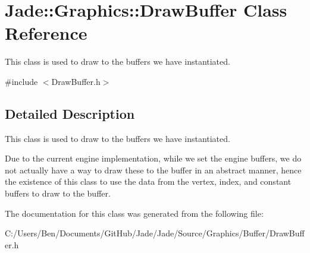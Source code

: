 \hypertarget{class_jade_1_1_graphics_1_1_draw_buffer}{}\section{Jade\+:\+:Graphics\+:\+:Draw\+Buffer Class Reference}
\label{class_jade_1_1_graphics_1_1_draw_buffer}


This class is used to draw to the buffers we have instantiated.  




{\ttfamily \#include $<$Draw\+Buffer.\+h$>$}



\subsection{Detailed Description}
This class is used to draw to the buffers we have instantiated. 

Due to the current engine implementation, while we set the engine buffers, we do not actually have a way to draw these to the buffer in an abstract manner, hence the existence of this class to use the data from the vertex, index, and constant buffers to draw to the buffer. 

The documentation for this class was generated from the following file\+:\begin{DoxyCompactItemize}
\item 
C\+:/\+Users/\+Ben/\+Documents/\+Git\+Hub/\+Jade/\+Jade/\+Source/\+Graphics/\+Buffer/Draw\+Buffer.\+h\end{DoxyCompactItemize}
